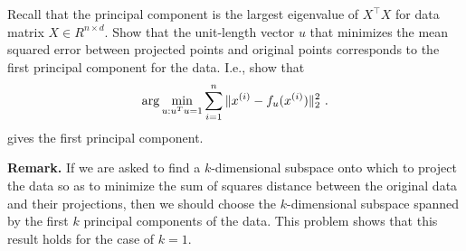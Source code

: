 \item {} Recall that the principal component is the largest eigenvalue of $X^\top X$ for data matrix $X \in R^{n \times d}$. Show that the unit-length vector $u$ that minimizes the 
mean squared error between projected points and original points corresponds
to the first principal component for the data. I.e., show that
$$ \arg \min_{u:u^Tu=1} \sum_{i=1}^{n} \|x^{(i)}-f_u(x^{(i)})\|_2^2 \ .$$
gives the first principal component.


{\bf Remark.} If we are asked to find a $k$-dimensional subspace onto which to
project the data so as to minimize the sum of squares distance between the
original data and their projections, then we should choose the $k$-dimensional
subspace spanned by the first $k$ principal components of the data.  This problem
shows that this result holds for the case of $k=1$.